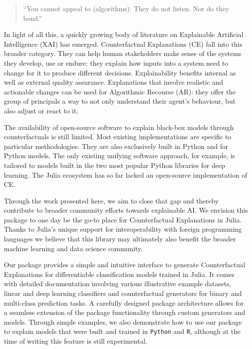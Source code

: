 \documentclass{juliacon}
\begin{document}
\begin{quote}
``You cannot appeal to (algorithms). They do not listen. Nor do they
bend.'' \cite{oneil2016weapons}
\end{quote}

In light of all this, a quickly growing body of literature on
Explainable Artificial Intelligence (XAI) has emerged. Counterfactual
Explanations (CE) fall into this broader category. They can help human
stakeholders make sense of the systems they develop, use or endure: they
explain how inputs into a system need to change for it to produce
different decisions. Explainability benefits internal as well as
external quality assurance. Explanations that involve realistic and
actionable changes can be used for Algorithmic Recourse (AR): they offer
the group of principals a way to not only understand their agent's
behaviour, but also adjust or react to it.

The availability of open-source software to explain black-box models
through counterfactuals is still limited. Most existing implementations
are specific to particular methodologies. They are also exclusively
built in Python and for Python models. The only existing unifying
software approach, for example, is tailored to models built in the two
most popular Python libraries for deep learning. The Julia ecosystem has
so far lacked an open-source implementation of CE.

Through the work presented here, we aim to close that gap and thereby
contribute to broader community efforts towards explainable AI. We
envision this package to one day be the go-to place for Counterfactual
Explanations in Julia. Thanks to Julia's unique support for
interoperability with foreign programming languages we believe that this
library may ultimately also benefit the broader machine learning and
data science community.

Our package provides a simple and intuitive interface to generate
Counterfactual Explanations for differentiable classification models
trained in Julia. It comes with detailed documentation involving various
illustrative example datasets, linear and deep learning classifiers and
counterfactual generators for binary and multi-class prediction tasks. A
carefully designed package architecture allows for a seamless extension
of the package functionality through custom generators and models.
Through simple examples, we also demonstrate how to use our package to
explain models that were built and trained in \texttt{Python} and
\texttt{R}, although at the time of writing this feature is still
experimental.
\end{document}
